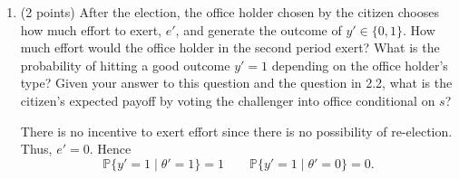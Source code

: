 \documentclass[11pt]{article}
\newcommand{\bbP}{\mathbb{P}}
\begin{document}
\begin{enumerate}
        
        Observing the signal $s$, what is the citizen’s consistent belief about $\theta'$, $\Pr(\theta' = 1 \mid s)$? Does this depend on $y$ and why?
\begin{solution}
    Using Bayes' rule:
    \begin{align*}
        \bbP\{\theta ' = 1\mid s\} &= \frac{\bbP\{\theta' = 1, s\}}{\bbP\{s\}}\\
        &= \frac{\bbP\{\theta' = 1\}\bbP\{s \mid \theta' = 1\}}{\bbP\{s \mid \theta' = 1\}\bbP\{\theta' = 1\} + \bbP\{s \mid \theta' = 0\}\bbP\{\theta' = 0\}}\\
        &= \frac{\frac{1}{2}2s}{\frac{1}{2}2s + 2(1-s)\frac{1}{2}}\\
        &= \frac{s}{s + (1-s)}\\
        &= s
    \end{align*}
    Thus, 
    \[\boxed{\bbP\{\theta' = 1 \mid s\} = s}\] which does not depend on $y.$ The reason the signal doesn't depend on $y$ is because the citizen receives the signal before they observe $y$ because the challenger has not had a chance to be in office yet. 
\end{solution}
        \item (2 points) After the election, the office holder chosen by the citizen chooses how much effort to exert, $e'$, and generate the outcome of $y' \in \{0, 1\}$. How much effort would the office holder in the second period exert? What is the probability of hitting a good outcome $y' = 1$ depending on the office holder’s type? Given
 your answer to this question and the question in 2.2, what is the citizen’s expected payoff
 by voting the challenger into office conditional on $s$?
\begin{solution}
    There is no incentive to exert effort since there is no possibility of re-election. Thus, $e' = 0.$ Hence 
    \[\boxed{\bbP\{y' = 1\mid \theta' = 1\}= 1 \qquad \bbP\{y' = 1\mid \theta' = 0\} = 0}.\]


\end{solution}
\end{enumerate}
\end{document}
